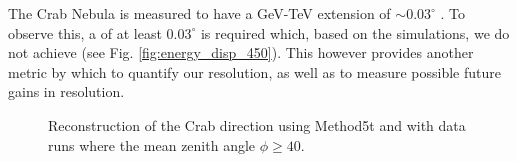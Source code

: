 \documentclass[main.tex]{subfiles}
\begin{document}
The Crab Nebula is measured to have a GeV-TeV extension of $\sim 0.03^\circ$ \cite{Fermi_LAT_Crab_extension}\cite{HESS_Crab_extension}. To observe this, a \rse of at least $0.03^\circ$ is required which, based on the simulations, we do not achieve (see Fig. \ref{fig:energy_disp_450}). This however provides another metric by which to quantify our resolution, as well as to measure possible future gains in resolution.

\begin{figure}[H]
  \begin{center}
  \end{center}
  \caption[Crab skymaps using the new \disp tables.]{Reconstruction of the Crab direction using Method5t and with data runs where the mean zenith angle $\phi\geq40$.}
\end{figure}
\end{document}
